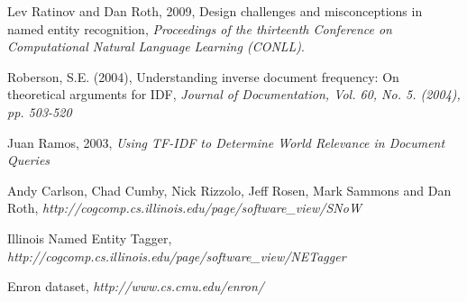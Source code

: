 \documentclass[senior,oneside]{UIUC}
\begin{document}
% 


\begin{thebibliography}{9}

  Lev Ratinov and Dan Roth, 2009,
  Design challenges and misconceptions in named entity recognition,
  \emph{Proceedings of the thirteenth Conference on Computational Natural Language Learning (CONLL)}.

Roberson, S.E. (2004),
Understanding inverse document frequency: On theoretical arguments for IDF,
 \emph{Journal of Documentation, Vol. 60, No. 5. (2004), pp. 503-520}

  Juan Ramos, 2003,
  \emph{Using TF-IDF to Determine World Relevance in Document Queries}

 Andy Carlson, Chad Cumby, Nick Rizzolo, Jeff Rosen, Mark Sammons and Dan Roth, 
 \emph{http://cogcomp.cs.illinois.edu/page/software\_view/SNoW}

Illinois Named Entity Tagger, 
\emph{http://cogcomp.cs.illinois.edu/page/software\_view/NETagger}

  Enron dataset,
  \emph{http://www.cs.cmu.edu/\texttildelow{}enron/}
 
\end{thebibliography}
\end{document}
